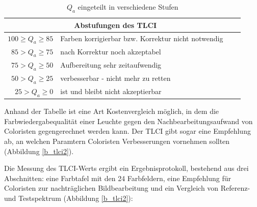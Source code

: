 	\begin{table}[htp] 
		\centering
		\begin{tabular}{rlcc}  %
		\toprule
		\multicolumn{2}{c}{\large\sffamily Abstufungen des TLCI}\\ 							
		\midrule
		$100 \geq  Q_{a} \geq 85$  & Farben korrigierbar bzw. Korrektur nicht notwendig\\ 
		$85 > Q_{a} \geq 75$ & nach Korrektur noch akzeptabel\\
		$75 > Q_{a} \geq 50$ & Aufbereitung sehr zeitaufwendig\\
		$50 > Q_{a} \geq 25$ & verbesserbar - nicht mehr zu retten\\
		$25 > Q_{a} \geq 0$ & ist und bleibt nicht akzeptierbar\\
		\bottomrule
		\end{tabular}
		\caption{$Q_{a}$ eingeteilt in verschiedene Stufen\protect\footnotemark}	
		\label{t_tlci}
	\end{table}
\noindent Anhand der Tabelle ist eine Art Kostenvergleich möglich, in dem die Farbwiedergabequalität einer Leuchte gegen den Nachbearbeitungsaufwand von Coloristen gegengerechnet werden kann. Der TLCI gibt sogar eine Empfehlung ab, an welchen Paramtern Coloristen Verbesserungen vornehmen sollten (Abbildung \ref{b_tlci2}).\newpage 

\noindent Die Messung des TLCI-Werts ergibt ein Ergebnisprotokoll, bestehend aus drei Abschnitten: eine Farbtafel mit den 24 Farbfeldern, eine Empfehlung für Coloristen zur nachträglichen Bildbearbeitung und ein Vergleich von Referenz- und Testspektrum (Abbildung \ref{b_tlci2}):\\ 

